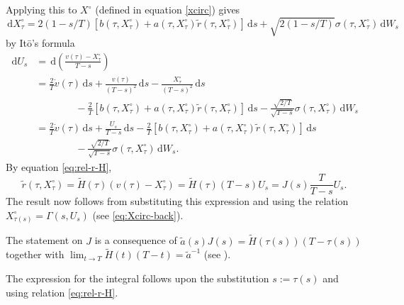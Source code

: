 \documentclass[preprint]{imsart}
\renewcommand{\tilde}{\widetilde}
\theoremstyle{definition}
\newcommand{\dd}{{\,\mathrm d}}
\begin{document}
Applying this to $X^\circ$ (defined in equation \eqref{xcirc}) gives
\[
\dd X^{\circ}_{\tau} =2(1 - s/T)[b(\tau, X^\circ_\tau) + a(\tau, X^\circ_\tau)\tilde r(\tau, X^\circ_\tau)]\dd s + \sqrt{2(1 - s/T)} \sigma(\tau, X^\circ_\tau) \dd W_s
\]
by It\=o's formula
\begin{align*} \dd U_s &= \dd\left(\frac{v(\tau)-X^\circ_{\tau}}{T-s}\right) \\ &
= \frac2T \dot v(\tau)\dd s +\frac{v(\tau)}{(T-s)^2} \dd s
  - \frac{X^\circ_{\tau}}{(T-s)^2} \dd s\\ &\qquad \qquad - \frac2T [b(\tau, X^\circ_\tau) + a(\tau, X^\circ_\tau)\tilde r(\tau, X^\circ_\tau)] \dd s - \frac{\sqrt{2/T}}{\sqrt{T - s}} \sigma(\tau, X^\circ_\tau) \dd W_s
\\ &= \frac2T \dot v(\tau)\dd s + \frac{U_s}{T-s} \dd s
- \frac2T [b(\tau, X^\circ_\tau) + a(\tau, X^\circ_\tau)\tilde r(\tau, X^\circ_\tau)] \dd s \\& \qquad \qquad - \frac{\sqrt{2/T}}{\sqrt{T - s}} \sigma(\tau, X^\circ_\tau) \dd W_s.
\end{align*}
By equation \eqref{eq:rel-r-H},
\[
\tilde r(\tau, X^\circ_\tau) = \tilde H(\tau)(v(\tau) - X^\circ_\tau)
= \tilde H(\tau)(T-s)U_s = J(s) \frac{T}{T-s} U_s.
\]
The result now follows from substituting this expression and using the relation $X^\circ_{\tau(s)} = \Gamma(s, U_s)$ (see \eqref{eq:Xcirc-back}).
 
The statement on $J$ is a consequence of $\tilde{a}(s) J(s)=\tilde{H}(\tau(s))(T-\tau(s))$ together with 
$\lim_{t\to T}\tilde H(t)(T-t) = \tilde a^{-1}$ (see \cite[Lemma 8]{Schauer}). 

The expression for the integral follows upon the substitution $s:= \tau(s)$ and using relation \eqref{eq:rel-r-H}. 
\end{document}
